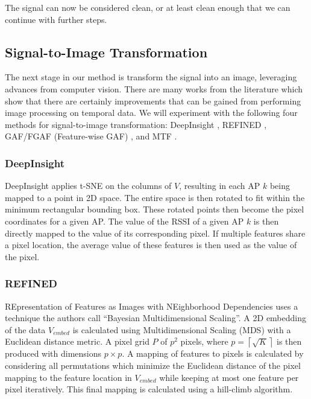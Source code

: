 The signal can now be considered clean, or at least clean enough that we can continue with further steps.

\subsection{Signal-to-Image Transformation}\label{sec:methodology-signal-to-image}


The next stage in our method is transform the signal into an image, leveraging advances from computer vision.
There are many works from the literature which show that there are certainly improvements that can be gained from performing image processing on temporal data.
We will experiment with the following four methods for signal-to-image transformation: DeepInsight \cite{sharma2019deepinsight}, REFINED \cite{bazgir2020representation}, GAF/FGAF (Feature-wise GAF) \cite{wang2015imaging,satyawan2023cnns}, and MTF \cite{wang2015imaging}.

\subsubsection{DeepInsight}

DeepInsight \cite{sharma2019deepinsight} applies t-SNE on the columns of $V$, resulting in each AP $k$ being mapped to a point in 2D space.
The entire space is then rotated to fit within the minimum rectangular bounding box.
These rotated points then become the pixel coordinates for a given AP.
The value of the RSSI of a given AP $k$ is then directly mapped to the value of its corresponding pixel.
If multiple features share a pixel location, the average value of these features is then used as the value of the pixel.

\subsubsection{REFINED}

REpresentation of Features as Images with NEighborhood Dependencies \cite{bazgir2020representation} uses a technique the authors call ``Bayesian Multidimensional Scaling''.
A 2D embedding of the data $V_{embed}$ is calculated using Multidimensional Scaling (MDS) with a Euclidean distance metric.
A pixel grid $P$ of $p^2$ pixels, where $p=\left\lceil \sqrt{K} \right\rceil$ is then produced with dimensions $p \times p$.
A mapping of features to pixels is calculated by considering all permutations which minimize the Euclidean distance of the pixel mapping to the feature location in $V_{embed}$ while keeping at most one feature per pixel iteratively.
This final mapping is calculated using a hill-climb algorithm.

